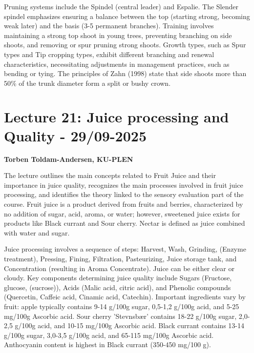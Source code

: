 \vspace{0.5em}
Pruning systems include the Spindel (central leader) and Espalie. The Slender spindel emphasizes ensuring a balance between the top (starting strong, becoming weak later) and the basis (3-5 permanent branches). Training involves maintaining a strong top shoot in young trees, preventing branching on side shoots, and removing or spur pruning strong shoots. Growth types, such as Spur types and Tip cropping types, exhibit different branching and renewal characteristics, necessitating adjustments in management practices, such as bending or tying. The principles of Zahn (1998) state that side shoots more than 50\% of the trunk diameter form a split or bushy crown.


\section{Lecture 21: Juice processing and Quality - 29/09-2025}
\textbf{Torben Toldam-Andersen, KU-PLEN}

\vspace{1em}
The lecture outlines the main concepts related to Fruit Juice and their importance in juice quality, recognizes the main processes involved in fruit juice processing, and identifies the theory linked to the sensory evaluation part of the course. Fruit juice is a product derived from fruits and berries, characterized by no addition of sugar, acid, aroma, or water; however, sweetened juice exists for products like Black currant and Sour cherry. Nectar is defined as juice combined with water and sugar.

\vspace{0.5em}
Juice processing involves a sequence of steps: Harvest, Wash, Grinding, (Enzyme treatment), Pressing, Fining, Filtration, Pasteurizing, Juice storage tank, and Concentration (resulting in Aroma Concentrate). Juice can be either clear or cloudy. Key components determining juice quality include Sugars (Fructose, glucose, (sucrose)), Acids (Malic acid, citric acid), and Phenolic compounds (Quercetin, Caffeic acid, Cinamic acid, Catechin). Important ingredients vary by fruit: apple typically contains 9-14 g/100g sugar, 0,5-1,2 g/100g acid, and 5-25 mg/100g Ascorbic acid. Sour cherry 'Stevnsbær' contains 18-22 g/100g sugar, 2,0-2,5 g/100g acid, and 10-15 mg/100g Ascorbic acid. Black currant contains 13-14 g/100g sugar, 3,0-3,5 g/100g acid, and 65-115 mg/100g Ascorbic acid. Anthocyanin content is highest in Black currant (350-450 mg/100 g).

